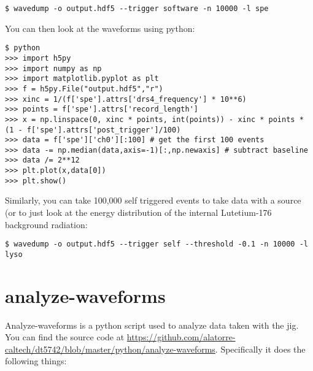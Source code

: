 \documentclass[12pt,openright,twoside]{report}
\begin{document}
\begin{mdframed}[backgroundcolor=light-gray, roundcorner=10pt,leftmargin=1, rightmargin=1, innerleftmargin=15, innertopmargin=15,innerbottommargin=15, outerlinewidth=1, linecolor=light-gray]
\begin{lstlisting}
$ wavedump -o output.hdf5 --trigger software -n 10000 -l spe
\end{lstlisting}
\end{mdframed}

You can then look at the waveforms using python:

\begin{mdframed}[backgroundcolor=light-gray, roundcorner=10pt,leftmargin=1, rightmargin=1, innerleftmargin=15, innertopmargin=15,innerbottommargin=15, outerlinewidth=1, linecolor=light-gray]
\begin{lstlisting}
$ python
>>> import h5py
>>> import numpy as np
>>> import matplotlib.pyplot as plt
>>> f = h5py.File("output.hdf5","r")
>>> xinc = 1/(f['spe'].attrs['drs4_frequency'] * 10**6)
>>> points = f['spe'].attrs['record_length']
>>> x = np.linspace(0, xinc * points, int(points)) - xinc * points * (1 - f['spe'].attrs['post_trigger']/100)
>>> data = f['spe']['ch0'][:100] # get the first 100 events
>>> data -= np.median(data,axis=-1)[:,np.newaxis] # subtract baseline
>>> data /= 2**12
>>> plt.plot(x,data[0])
>>> plt.show()
\end{lstlisting}
\end{mdframed}

Similarly, you can take 100,000 self triggered events to take data with a
source (or to just look at the energy distribution of the internal Lutetium-176
background radiation:

\begin{mdframed}[backgroundcolor=light-gray, roundcorner=10pt,leftmargin=1, rightmargin=1, innerleftmargin=15, innertopmargin=15,innerbottommargin=15, outerlinewidth=1, linecolor=light-gray]
\begin{lstlisting}
$ wavedump -o output.hdf5 --trigger self --threshold -0.1 -n 10000 -l lyso
\end{lstlisting}
\end{mdframed}

\section{analyze-waveforms}

Analyze-waveforms is a python script used to analyze data taken with the jig.
You can find the source code at
\url{https://github.com/alatorre-caltech/dt5742/blob/master/python/analyze-waveforms}.
Specifically it does the following things:
\end{document}
